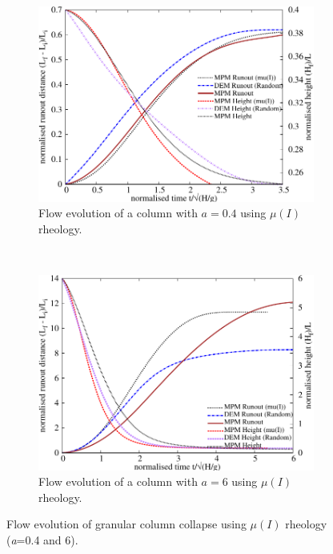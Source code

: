 \begin{figure}[tbhp]
\centering
\begin{subfigure}[b]{0.975\textwidth}
\includegraphics[width=\textwidth]{flowa04muI}
\caption{Flow evolution of a column with $a=0.4$ using $\mu(I)$ rheology.}
\label{fig:flowa04muI}
\end{subfigure}
\\
\begin{subfigure}[b]{0.975\textwidth}
\centering
\includegraphics[width=\textwidth]{flowa6muI}
\caption{Flow evolution of a column with $a=6$ using $\mu(I)$ rheology.}
\label{fig:flowa6muI}
\end{subfigure}
\caption{Flow evolution of granular column collapse using $\mu(I)$ rheology 
(\textit{a}=0.4 and 6).}
\label{fig:flow_muI}
\end{figure}

